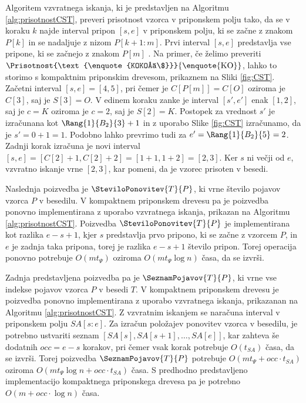 Algoritem vzvratnega iskanja, ki je predstavljen na Algoritmu \ref{alg:prisotnostCST}, preveri prisotnost vzorca v priponskem polju tako, da se v koraku $k$ najde interval pripon $[s,e]$ v priponskem polju, ki se začne z znakom $P[k]$ in se nadaljuje z nizom $P[k+1:m]$. Prvi interval $[s,e]$ predstavlja vse pripone, ki se začnejo z znakom $P[m]$ \cite{Navarro2016}. Na primer, če želimo preveriti $\Prisotnost{\text{\enquote{KOKOŠ\$}}}{\text{\enquote{KO}}}$, lahko to storimo s kompaktnim priponskim drevesom, prikaznem na Sliki \ref{fig:CST}. Začetni interval $[s,e]=[4,5]$, pri čemer je $C[P[m]]=C[O]$ oziroma je $C[3]$, saj je $S[3]=O$. V edinem koraku zanke je interval $[s',e']$ enak $[1,2]$, saj je $c=K$ oziroma je $c=2$, saj je $S[2]=K$. Postopek za vrednost $s'$ je izračunana kot $\Rang{1}{B_2}{3}+1$ in z uporabo Slike \ref{fig:CST} izračunamo, da je $s'=0+1=1$. Podobno lahko prevrimo tudi za $e'=\Rang{1}{B_2}{5}=2$. Zadnji korak izračuna je novi interval $[s,e]=[C[2]+1,C[2]+2]=[1+1,1+2]=[2,3]$. Ker $s$ ni večji od $e$, vzvratno iskanje vrne $[2,3]$, kar pomeni, da je vzorec prisoten v besedi.

Naslednja poizvedba je $\SteviloPonovitev{T}{P}$, ki vrne število pojavov vzorca $P$ v besedilu. V kompaktnem priponskem drevesu pa je poizvedba ponovno implementirana z uporabo vzvratnega iskanja, prikazan na Algoritmu \ref{alg:prisotnostCST}. Poizvedba $\SteviloPonovitev{T}{P}$ je implementirana kot razlika $e-s+1$, kjer $s$ predstavlja prvo pripono, ki se začne z vzorcem $P$, in $e$ je zadnja taka pripona, torej je razlika $e-s+1$ število pripon. Torej operacija ponovno potrebuje $O(mt_\Psi)$ oziroma $O(mt_\Psi\log{n})$ časa, da se izvrši.

Zadnja predstavljena poizvedba pa je $\SeznamPojavov{T}{P}$, ki vrne vse indekse pojavov vzorca $P$ v besedi $T$. V kompaktnem priponskem drevesu je poizvedba ponovno implementirana z uporabo vzvratnega iskanja, prikazanan na Algoritmu \ref{alg:prisotnostCST}. Z vzvratnim iskanjem se naračuna interval v priponskem polju $SA[s:e]$. Za izračun položajev ponovitev vzorca v besedilu, je potrebno ustvariti seznam $[SA[s],SA[s+1],\dots,SA[e]]$, kar zahteva še dodatnih $occ=e-s$ korakov, pri čemer vsak korak potrebuje $O(t_{SA})$ časa, da se izvrši. Torej poizvedba $\SeznamPojavov{T}{P}$ potrebuje $O(mt_\Psi+occ\cdot t_{SA})$ oziroma $O(mt_\Psi \log{n}+occ\cdot t_{SA})$ časa. S predhodno predstavljeno implementacijo kompaktnega priponskega drevesa pa je potrebno $O(m+occ\cdot\log{n})$ časa.

